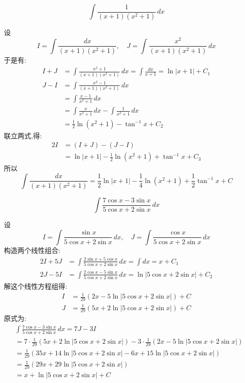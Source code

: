 \begin{questions}
    \question 
    \[
    \int \frac{1}{(x+1)(x^2+1)} \, dx
    \]
    \begin{solution}
        设
        \[
        I = \int \frac{dx}{(x+1)(x^2+1)}, \quad 
        J = \int \frac{x^2}{(x+1)(x^2+1)}\, dx
        \]
        于是有:
        \begin{align*}
        I + J &= \int \frac{x^2 + 1}{(x+1)(x^2+1)} \, dx 
        = \int \frac{dx}{x + 1}
        = \ln|x + 1| + C_1 \\[6pt]
        J - I &= \int \frac{x^2 - 1}{(x+1)(x^2 + 1)} \, dx \\
        &= \int \frac{x - 1}{x^2 + 1} \, dx \\
        &= \int \frac{x}{x^2 + 1} \, dx - \int \frac{1}{x^2 + 1} \, dx \\
        &= \frac{1}{2} \ln(x^2 + 1) - \tan^{-1} x + C_2
        \end{align*}
        联立两式,得:
        \begin{align*}
        2I &= (I + J) - (J - I) \\
        &= \ln|x + 1| - \frac{1}{2} \ln(x^2 + 1) + \tan^{-1} x +C_3
        \end{align*}
        所以
        \[
        \int \frac{dx}{(x+1)(x^2+1)} 
        = \frac{1}{2} \ln|x + 1| - \frac{1}{4} \ln(x^2 + 1) + \frac{1}{2}\tan^{-1} x  + C
        \]
    \end{solution}

    \question 
    \[
    \int \frac{7\cos x - 3\sin x}{5\cos x + 2\sin x} \, dx
    \]
    \begin{solution}
        设
        \[
        I = \int \frac{\sin x}{5\cos x + 2\sin x} \, dx, \quad
        J = \int \frac{\cos x}{5\cos x + 2\sin x} \, dx
        \]
        构造两个线性组合:
        \begin{align*}
        2I + 5J &= \int \frac{2\sin x + 5\cos x}{5\cos x + 2\sin x} \, dx = \int dx = x + C_1 \\[6pt]
        2J - 5I &= \int \frac{2\cos x - 5\sin x}{5\cos x + 2\sin x} \, dx = \ln|5\cos x + 2\sin x| + C_2
        \end{align*}
        解这个线性方程组得:
        \begin{align*}
        I &= \frac{1}{29} \left( 2x - 5 \ln|5\cos x + 2\sin x| \right) + C \\
        J &= \frac{1}{29} \left( 5x + 2 \ln|5\cos x + 2\sin x| \right) + C
        \end{align*}
        原式为:
        \begin{align*}
        &\int \frac{7\cos x - 3\sin x}{5\cos x + 2\sin x} \, dx 
        = 7J - 3I \\
        &= 7 \cdot \frac{1}{29}(5x + 2\ln|5\cos x + 2\sin x|) - 3 \cdot \frac{1}{29}(2x - 5\ln|5\cos x + 2\sin x|) \\
        &= \frac{1}{29} \left(35x + 14\ln|5\cos x + 2\sin x| - 6x + 15\ln|5\cos x + 2\sin x| \right) \\
        &= \frac{1}{29} \left(29x + 29\ln|5\cos x + 2\sin x| \right) \\
        &= x + \ln|5\cos x + 2\sin x| + C
        \end{align*}
    \end{solution}


\end{questions}
